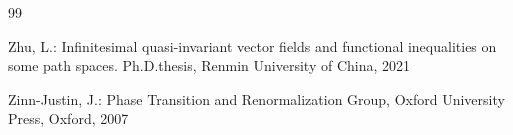 \documentclass[11pt]{article}
\numberwithin{equation}{section}%
\numberwithin{figure}{section}%
\theoremstyle{remark}
\begin{document}
\begin{thebibliography}{99}
		
		Zhu, L.: Infinitesimal quasi-invariant vector fields and functional inequalities on  some path spaces. Ph.D.thesis, Renmin University of China, 2021
		
		Zinn-Justin, J.: Phase Transition and Renormalization Group, Oxford University Press, Oxford, 2007
		
		
		
		
		
		
		
	\end{thebibliography}
	
\end{document}
